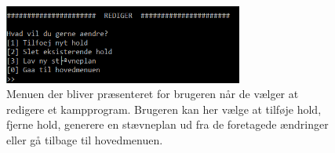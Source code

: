\clearpage

\begin{figure}[H]
  \centering
  \includegraphics[width=0.7\textwidth]{figures/EditMenuScreenshot.PNG}
  \caption{Menuen der bliver præsenteret for brugeren når de vælger at redigere et kampprogram. Brugeren kan her vælge at tilføje hold, fjerne hold, generere en stævneplan ud fra de foretagede ændringer eller gå tilbage til hovedmenuen.}
  \label{fig:editmenu}
\end{figure}


